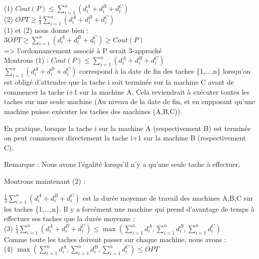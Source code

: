 \documentclass[12pt]{article}
\begin{document}
(1) $Cout(P) \le \displaystyle\sum_{i=1}^n(d_i^A+d_i^B+d_i^C)$\\

(2) $OPT \ge \frac{1}{3}\displaystyle\sum_{i=1}^n(d_i^A+d_i^B+d_i^C)$\\

(1) et (2) nous donne bien :\\

$3OPT \ge \displaystyle\sum_{i=1}^n(d_i^A+d_i^B+d_i^C) \ge Cout(P)$\\

=> l'ordonnancement associé à P serait 3-approché\\

Montrons (1) : $Cout(P) \le \displaystyle\sum_{i=1}^n(d_i^A+d_i^B+d_i^C)$\\

$\displaystyle\sum_{i=1}^n(d_i^A+d_i^B+d_i^C)$ correspond à la date de fin des taches \{1,...,n\} lorsqu'on est obligé d'attendre que la tache i soit terminée sur la machine C avant de commencer la tache i+1 sur la machine A. Cela reviendrait à exécuter toutes les taches sur une seule machine (Au niveau de la date de fin, et en supposant qu'une machine puisse exécuter les taches des machines (A,B,C)). 

En pratique, lorsque la tache i sur la machine A (respectivement B) est terminée on peut commencer directement la tache i+1 sur la machine B (respectivement C).

Remarque : Nous avons l'égalité lorsqu'il n'y a qu'une seule tache à effectuer.

Montrons maintenant (2) :

$\frac{1}{3}\displaystyle\sum_{i=1}^n(d_i^A+d_i^B+d_i^C)$ est la durée moyenne de travail des machines A,B,C sur les taches \{1,...,n\}. Il y a forcément une machine qui prend d'avantage de temps à effectuer ses taches que la durée moyenne :\\

(3) $\frac{1}{3}\displaystyle\sum_{i=1}^n(d_i^A+d_i^B+d_i^C) \le \max(\displaystyle\sum_{i=1}^n d_i^A,\displaystyle\sum_{i=1}^n d_i^B,\displaystyle\sum_{i=1}^n d_i^C)$\\

Comme toute les taches doivent passer sur chaque machine, nous avons :\\

(4) $\max(\displaystyle\sum_{i=1}^n d_i^A,\displaystyle\sum_{i=1}^n d_i^B,\displaystyle\sum_{i=1}^n d_i^C) \le OPT$\\
\end{document}
